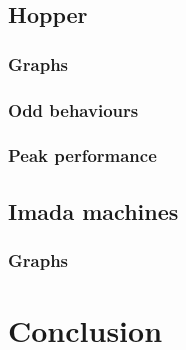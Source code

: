 \documentclass[a4paper,11pt,oneside]{book}
\begin{document}



\section{Hopper}
\subsection{Graphs}
\subsection{Odd behaviours}
\subsection{Peak performance}

\section{Imada machines}
\subsection{Graphs}

\chapter{Conclusion}

\end{document}
